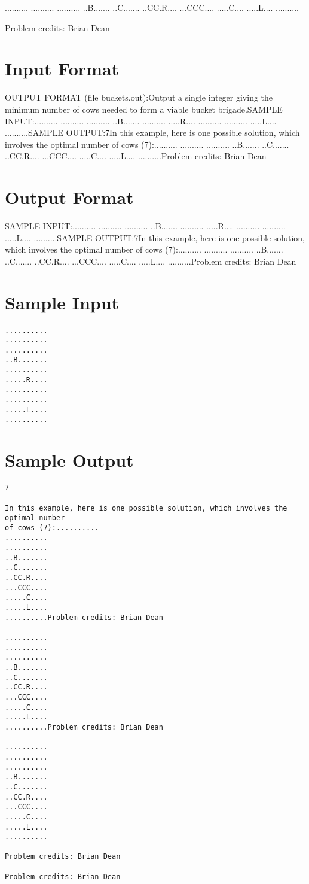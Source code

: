 \documentclass[12pt]{article}
\begin{document}
..........
..........
..........
..B.......
..C.......
..CC.R....
...CCC....
.....C....
.....L....
..........


Problem credits: Brian Dean



\section*{Input Format}
OUTPUT FORMAT (file buckets.out):Output a single integer giving the minimum number of cows needed to form a 
viable bucket brigade.SAMPLE INPUT:..........
..........
..........
..B.......
..........
.....R....
..........
..........
.....L....
..........SAMPLE OUTPUT:7In this example, here is one possible solution, which involves the optimal number
of cows (7):..........
..........
..........
..B.......
..C.......
..CC.R....
...CCC....
.....C....
.....L....
..........Problem credits: Brian Dean

\section*{Output Format}
SAMPLE INPUT:..........
..........
..........
..B.......
..........
.....R....
..........
..........
.....L....
..........SAMPLE OUTPUT:7In this example, here is one possible solution, which involves the optimal number
of cows (7):..........
..........
..........
..B.......
..C.......
..CC.R....
...CCC....
.....C....
.....L....
..........Problem credits: Brian Dean

\section*{Sample Input}
\begin{verbatim}
..........
..........
..........
..B.......
..........
.....R....
..........
..........
.....L....
..........
\end{verbatim}

\section*{Sample Output}
\begin{verbatim}
7

In this example, here is one possible solution, which involves the optimal number
of cows (7):..........
..........
..........
..B.......
..C.......
..CC.R....
...CCC....
.....C....
.....L....
..........Problem credits: Brian Dean

..........
..........
..........
..B.......
..C.......
..CC.R....
...CCC....
.....C....
.....L....
..........Problem credits: Brian Dean

..........
..........
..........
..B.......
..C.......
..CC.R....
...CCC....
.....C....
.....L....
..........

Problem credits: Brian Dean

Problem credits: Brian Dean
\end{verbatim}
\end{document}
